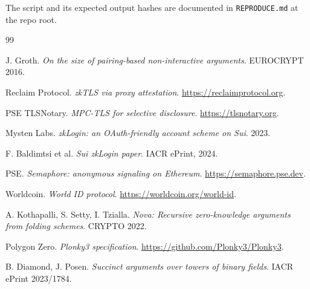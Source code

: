 \documentclass[11pt,a4paper]{article}
\begin{document}
The script and its expected output hashes are documented in
\texttt{REPRODUCE.md} at the repo root.

\begin{thebibliography}{99}

J. Groth.
\emph{On the size of pairing-based non-interactive arguments}.
EUROCRYPT 2016.

Reclaim Protocol.
\emph{zkTLS via proxy attestation}.
\url{https://reclaimprotocol.org}.

PSE TLSNotary.
\emph{MPC-TLS for selective disclosure}.
\url{https://tlsnotary.org}.

Mysten Labs.
\emph{zkLogin: an OAuth-friendly account scheme on Sui}.
2023.

F. Baldimtsi et al.
\emph{Sui zkLogin paper}.
IACR ePrint, 2024.

PSE.
\emph{Semaphore: anonymous signaling on Ethereum}.
\url{https://semaphore.pse.dev}.

Worldcoin.
\emph{World ID protocol}.
\url{https://worldcoin.org/world-id}.

A. Kothapalli, S. Setty, I. Tzialla.
\emph{Nova: Recursive zero-knowledge arguments from folding schemes}.
CRYPTO 2022.

Polygon Zero.
\emph{Plonky3 specification}.
\url{https://github.com/Plonky3/Plonky3}.

B. Diamond, J. Posen.
\emph{Succinct arguments over towers of binary fields}.
IACR ePrint 2023/1784.

\end{thebibliography}
\end{document}

